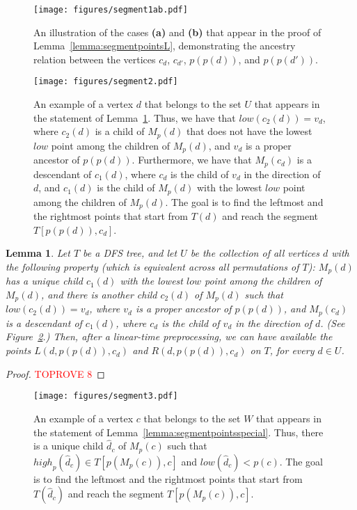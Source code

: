 \documentclass[11pt,a4paper]{article}
\newtheorem{lemma}[theorem]{Lemma}
\begin{document}
\begin{figure}[h!]\centering
\texttt{[image: figures/segment1ab.pdf]}
\caption{\small{An illustration of the cases \textbf{(a)} and \textbf{(b)} that appear in the proof of Lemma~\ref{lemma:segmentpointsL}, demonstrating the ancestry relation between the vertices $c_d$, $c_{d'}$, $p(p(d))$, and $p(p(d'))$.}}\label{figure:segment1ab}
\end{figure}

\begin{figure}[h!]\centering
\texttt{[image: figures/segment2.pdf]}
\caption{\small{An example of a vertex $d$ that belongs to the set $U$ that appears in the statement of Lemma~\ref{lemma:segmentpointslow}. Thus, we have that $\mathit{low}(c_2(d))=v_d$, where $c_2(d)$ is a child of $M_p(d)$ that does not have the lowest $\mathit{low}$ point among the children of $M_p(d)$, and $v_d$ is a proper ancestor of $p(p(d))$. Furthermore, we have that $M_p(c_d)$ is a descendant of $c_1(d)$, where $c_d$ is the child of $v_d$ in the direction of $d$, and $c_1(d)$ is the child of $M_p(d)$ with the lowest $\mathit{low}$ point among the children of $M_p(d)$. The goal is to find the leftmost and the rightmost points that start from $T(d)$ and reach the segment $T[p(p(d)),c_d]$.}}\label{figure:segment2}
\end{figure}

\begin{lemma}
\label{lemma:segmentpointslow}
Let $T$ be a DFS tree, and let $U$ be the collection of all vertices $d$ with the following property (which is equivalent across all permutations of $T$): $M_p(d)$ has a unique child $c_1(d)$ with the lowest $\mathit{low}$ point among the children of $M_p(d)$, and there is another child $c_2(d)$ of $M_p(d)$ such that $\mathit{low}(c_2(d))=v_d$, where $v_d$ is a proper ancestor of $p(p(d))$, and $M_p(c_d)$ is a descendant of $c_1(d)$, where $c_d$ is the child of $v_d$ in the direction of $d$. (See Figure~\ref{figure:segment2}.) Then, after a linear-time preprocessing, we can have available the points $L(d,p(p(d)),c_d)$ and $R(d,p(p(d)),c_d)$ on $T$, for every $d\in U$.
\end{lemma}
\begin{proof}\textcolor{red}{TOPROVE 8}\end{proof}


\begin{figure}[h!]\centering
\texttt{[image: figures/segment3.pdf]}
\caption{\small{An example of a vertex $c$ that belongs to the set $W$ that appears in the statement of Lemma~\ref{lemma:segmentpointsspecial}. Thus, there is a unique child $\hat{d}_c$ of $M_p(c)$ such that $\mathit{high}_p(\hat{d}_c)\in T[p(M_p(c)),c]$ and $\mathit{low}(\hat{d}_c)<p(c)$. The goal is to find the leftmost and the rightmost points that start from $T(\hat{d}_c)$ and reach the segment $T[p(M_p(c)),c]$.}}\label{figure:segment3}
\end{figure}
\end{document}
